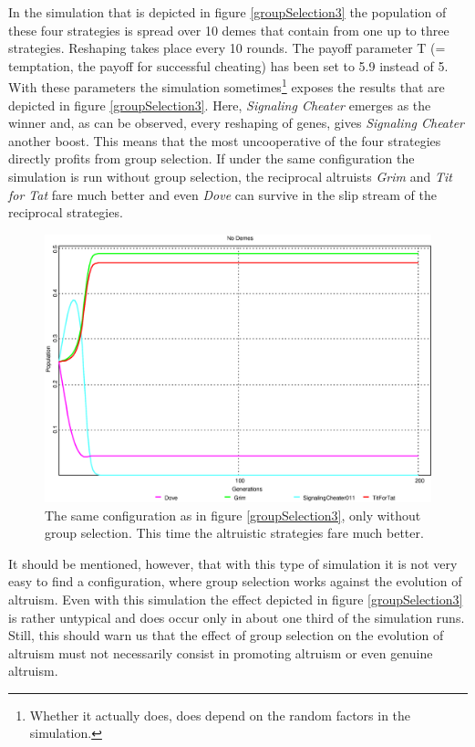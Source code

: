 In the simulation that is depicted in figure \ref{groupSelection3} the
population of these four strategies is spread over 10 demes that contain from
one up to three strategies. Reshaping takes place every 10 rounds. The payoff
parameter T (= temptation, the payoff for successful cheating) has been set to
5.9 instead of 5. With these parameters the simulation
sometimes\footnote{Whether it actually does, does depend on the random factors
in the simulation.} exposes the results that are depicted in figure
\ref{groupSelection3}. Here, {\em Signaling Cheater} emerges as the winner
and, as can be observed, every reshaping of genes, gives {\em Signaling
  Cheater} another boost. This means that the most uncooperative of the four
strategies directly profits from group selection. If under the same
configuration the simulation is run without group selection, the reciprocal
altruists {\em Grim} and {\em Tit for Tat} fare much better and even {\em
  Dove} can survive in the slip stream of the reciprocal strategies.

\begin{figure}
\begin{center}
\includegraphics[width=20cm]{images/group_selection4.eps} %
\caption{\label{groupSelection4} The same configuration as in figure
\ref{groupSelection3}, only without group selection. This time the altruistic
strategies fare much better.}
\end{center}
\end{figure}

It should be mentioned, however, that with this type of simulation it is not
very easy to find a configuration, where group selection works against the
evolution of altruism. Even with this simulation the effect depicted in figure
\ref{groupSelection3} is rather untypical and does occur only in about one third
of the simulation runs. Still, this should warn us that the effect of group
selection on the evolution of altruism must not necessarily consist in
promoting altruism or even genuine altruism.

